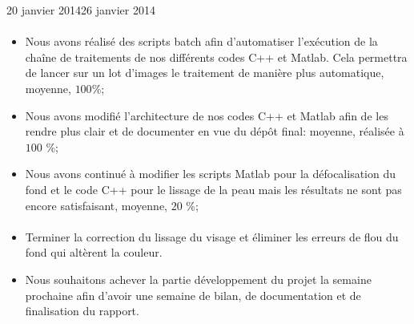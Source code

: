\documentclass[12pt]{fiche-rd-info}
\begin{document}
\begin{fichesuivi}{20 janvier 2014}{26 janvier 2014}
\paragraph{}
	\begin{travaileffectue}
		\begin{itemize}
			\item Nous avons réalisé des scripts batch afin d'automatiser l'exécution de la chaîne de  traitements de nos différents codes C++ et Matlab. Cela permettra de lancer sur un lot d'images le traitement de manière plus automatique, moyenne, $100$\%;
			\item Nous avons modifié l'architecture de nos codes C++ et Matlab afin de les rendre plus clair et de documenter en vue du dépôt final: moyenne, réalisée à $100$ \%;
			\item Nous avons continué à modifier les scripts Matlab pour la défocalisation du fond et le code C++ pour le lissage de la peau mais les résultats ne sont pas encore satisfaisant, moyenne, $20$ \%;
		\end{itemize}
	\end{travaileffectue}


\paragraph*{}
	\begin{planification}
		\begin{itemize}
			\item Terminer la correction du lissage du visage et éliminer les erreurs de flou du fond qui altèrent la couleur.
			\item Nous souhaitons achever la partie développement du projet la semaine prochaine afin d'avoir une semaine de bilan, de documentation et de finalisation du rapport.
\end{itemize}
	\end{planification}
\end{fichesuivi}
\end{document}
